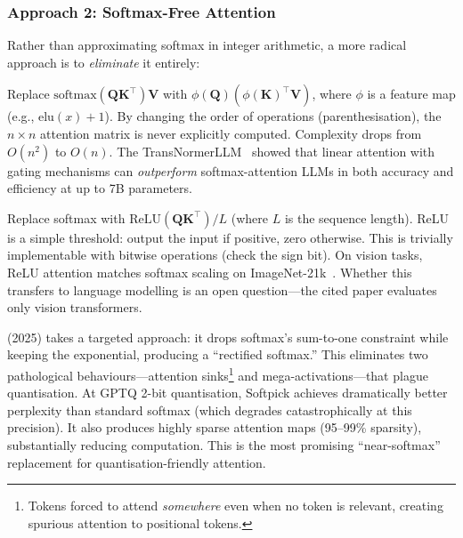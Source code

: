 \subsubsection{Approach 2: Softmax-Free Attention}

Rather than approximating softmax in integer arithmetic, a more
radical approach is to \emph{eliminate} it entirely:

\begin{description}[leftmargin=1em]
  \item[Linear attention~\cite{katharopoulos2020linear}.]
    Replace $\text{softmax}(\bm{Q}\bm{K}^\top)\bm{V}$
    with $\phi(\bm{Q})(\phi(\bm{K})^\top\bm{V})$, where $\phi$ is a
    feature map (e.g., $\text{elu}(x) + 1$). By changing the order
    of operations (parenthesisation), the $n \times n$ attention
    matrix is never explicitly computed. Complexity drops from
    $O(n^2)$ to $O(n)$. The TransNormerLLM~\cite{qin2023transnormerllm}
    showed that linear attention with gating mechanisms can
    \emph{outperform} softmax-attention LLMs in both accuracy and
    efficiency at up to 7B parameters.

  \item[ReLU attention~\cite{wortsman2023relu}.]
    Replace softmax with
    $\text{ReLU}(\bm{Q}\bm{K}^\top) / L$ (where $L$ is the
    sequence length). ReLU is a simple threshold: output the input
    if positive, zero otherwise. This is trivially implementable
    with bitwise operations (check the sign bit). On vision tasks,
    ReLU attention matches softmax scaling on
    ImageNet-21k~\cite{wortsman2023relu}. Whether this transfers
    to language modelling is an open question---the cited paper
    evaluates only vision transformers.

  \item[Softpick~\cite{fuadi2025softpick}] (2025) takes a
    targeted approach: it drops softmax's sum-to-one constraint
    while keeping the exponential, producing a ``rectified softmax.''
    This eliminates two pathological behaviours---attention
    sinks\footnote{Tokens forced to attend \emph{somewhere} even
    when no token is relevant, creating spurious attention to
    positional tokens.} and mega-activations---that plague
    quantisation. At GPTQ 2-bit quantisation, Softpick achieves
    dramatically better perplexity than standard softmax (which
    degrades catastrophically at this precision). It also produces
    highly sparse attention maps (95--99\% sparsity), substantially
    reducing computation. This is the most promising ``near-softmax''
    replacement for quantisation-friendly attention.


\end{description}
